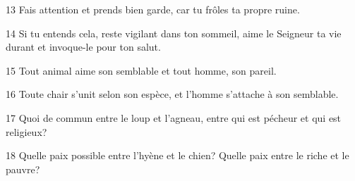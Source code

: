 
13 Fais attention et prends bien garde, car tu frôles ta propre ruine.

14 Si tu entends cela, reste vigilant dans ton sommeil, aime le Seigneur ta vie durant et invoque-le pour ton salut.

15 Tout animal aime son semblable et tout homme, son pareil.

16 Toute chair s’unit selon son espèce, et l’homme s’attache à son semblable.

17 Quoi de commun entre le loup et l’agneau, entre qui est pécheur et qui est religieux?

18 Quelle paix possible entre l’hyène et le chien? Quelle paix entre le riche et le pauvre?